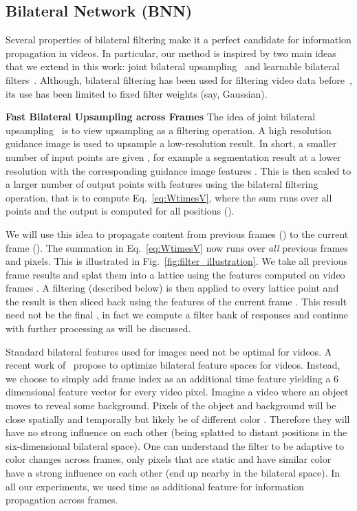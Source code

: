 \documentclass[10pt,twocolumn,letterpaper]{article}
\begin{document}
\subsection{Bilateral Network (BNN)}\label{sec:bilateralnetwork}
Several properties of bilateral filtering make it a perfect candidate for information propagation in videos.
In particular, our method is inspired by two main ideas that we extend in this work: joint bilateral upsampling~\cite{kopf2007joint} and learnable bilateral filters~\cite{jampani_2016_cvpr}. Although,
bilateral filtering has been used for filtering video data before~\cite{paris2008edge},
its use has been limited to fixed filter weights (say, Gaussian).

{\bf Fast Bilateral Upsampling across Frames} The idea of joint bilateral upsampling~\cite{kopf2007joint}
is to view upsampling as a filtering operation.
A high resolution guidance image is used to upsample a low-resolution result.
In short, a smaller number of input points are given , for example a
segmentation result  at a lower resolution with the corresponding guidance image
features . This is then scaled to a larger number of output points  with features 
using the bilateral filtering operation, that is to compute Eq.~\ref{eq:WtimesV}, where the sum runs over all 
points and the output is computed for all  positions ().


We will use this idea to propagate content from previous frames
() to the current frame ().
The summation in Eq.~\ref{eq:WtimesV} now runs over \emph{all} previous frames and pixels.
This is illustrated in Fig.~\ref{fig:filter_illustration}. We take all previous frame results
 and splat them into a lattice using the features  computed on video frames
.
A filtering (described below) is then applied to every lattice point and the result is then sliced back using the
features  of the current frame .
This result need not be the final , in fact we compute a filter bank of responses and continue
with further processing as will be discussed.

Standard bilateral features  used for images need not be optimal for videos.
A recent work of~\cite{kundu2016feature} propose to optimize bilateral feature spaces for
videos.
Instead, we choose to simply add frame index  as an additional time feature yielding a 6 dimensional feature
vector  for every video pixel.
Imagine a video where an object moves to reveal some background.
Pixels of the object and background will be close spatially  and temporally  but likely be of different color .
Therefore they will have no strong influence on each other (being splatted to distant positions in the six-dimensional bilateral space).
One can understand the filter to be adaptive to color changes across frames, only pixels that are static and have similar color have a strong influence on each other (end up nearby in the bilateral space).
In all our experiments, we used time  as additional feature for information propagation across frames.
\end{document}

